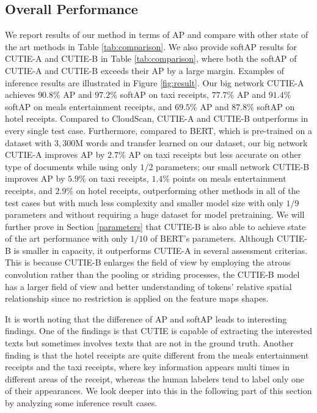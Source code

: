 \documentclass[10pt,twocolumn,letterpaper]{article}
\begin{document}
\subsection{Overall Performance}
We report results of our method in terms of AP and compare with other state of the art methods in Table \ref{tab:comparison}. We also provide softAP results for CUTIE-A and CUTIE-B in Table \ref{tab:comparison}, where both the softAP of CUTIE-A and CUTIE-B exceeds their AP by a large margin.  Examples of inference results are illustrated in Figure \ref{fig:result}. Our big network CUTIE-A achieves $90.8\%$ AP and $97.2\%$ softAP on taxi receipts, $77.7\%$ AP and $91.4\%$ softAP on meals entertainment receipts, and $69.5\%$ AP and $87.8\%$ softAP on hotel receipts. Compared to CloudScan, CUTIE-A and CUTIE-B outperforms in every single test case. Furthermore, compared to BERT, which is pre-trained on a dataset with $3,300$M words and transfer learned on our dataset, our big network CUTIE-A improves AP by $2.7\%$ AP on taxi receipts but less accurate on other type of documents while using only $1/2$ parameters; our small network CUTIE-B improves AP by $5.9\%$ on taxi receipts, $1.4\%$ points on meals entertainment receipts, and $2.9\%$ on hotel receipts, outperforming other methods in all of the test cases but with much less complexity and smaller model size with only $1/9$ parameters and without requiring a huge dataset for model pretraining. We will further prove in Section \ref{parameters} that CUTIE-B is also able to achieve state of the art performance with only $1/10$ of BERT's parameters. Although CUTIE-B is smaller in capacity, it outperforms CUTIE-A in several assessment criterias. This is because CUTIE-B enlarges the field of view by employing the atrous convolution rather than the pooling or striding processes, the CUTIE-B model has a larger field of view and better understanding of tokens' relative spatial relationship since no restriction is applied on the feature maps shapes. 

It is worth noting that the difference of AP and softAP leads to interesting findings. One of the findings is that CUTIE is capable of extracting the interested texts but sometimes involves texts that are not in the ground truth. Another finding is that the hotel receipts are quite different from the meals entertainment receipts and the taxi receipts, where key information appears multi times in different areas of the receipt, whereas the human labelers tend to label only one of their appearances. We look deeper into this in the following part of this section by analyzing some inference result cases.
\end{document}

